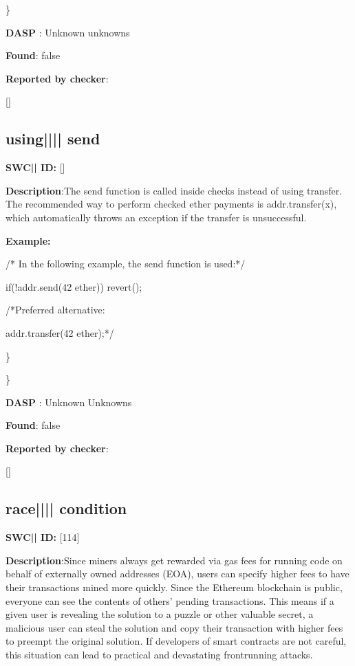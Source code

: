 \documentclass{article}
\begin{document}
\} 

\textbf{DASP} : Unknown unknowns

\textbf{Found}: false

\textbf{Reported by checker}: 
\begin{ffcode} 

[]
\end{ffcode} 
\subsection{using{||\textunderscore|| }send} 
\textbf{SWC{|\textunderscore| }ID:} []

\textbf{Description}:The send function is called inside checks instead of using transfer. The recommended way to perform checked ether payments is addr.transfer(x), which automatically throws an exception if the transfer is unsuccessful.


\textbf{Example:} 
\begin{ffcode} 

/* In the following example, the send function is used:*/ 


if(!addr.send(42 ether)) {
    revert();
}

 /*Preferred alternative:

addr.transfer(42 ether);*/ 

\end{ffcode} 
\} 

\} 

\textbf{DASP} : Unknown Unknowns

\textbf{Found}: false

\textbf{Reported by checker}: 
\begin{ffcode} 

[]
\end{ffcode} 
\subsection{race{||\textunderscore|| }condition} 
\textbf{SWC{|\textunderscore| }ID:} [114]

\textbf{Description}:Since miners always get rewarded via gas fees for running code on behalf of externally owned addresses (EOA), users can specify higher fees to have their transactions mined more quickly. Since the Ethereum blockchain is public, everyone can see the contents of others' pending transactions. This means if a given user is revealing the solution to a puzzle or other valuable secret, a malicious user can steal the solution and copy their transaction with higher fees to preempt the original solution. If developers of smart contracts are not careful, this situation can lead to practical and devastating front{\textendash}running attacks.
\end{document}
